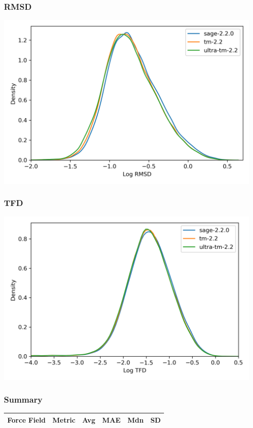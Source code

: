 \documentclass{beamer}
\begin{document}
\begin{frame}
  \frametitle{RMSD}
  \begin{center}
    \includegraphics[height=0.8\textheight]{figs/rmsd}
  \end{center}
\end{frame}

\begin{frame}
  \frametitle{TFD}
  \begin{center}
    \includegraphics[height=0.8\textheight]{figs/tfd}
  \end{center}
\end{frame}

\begin{frame}
  \frametitle{Summary}
  \begin{table}
    \centering
    \begin{tabular}{llrrrr}
      Force Field & Metric & Avg & MAE & Mdn & SD \\
      \hline
      
    \end{tabular}
  \end{table}
\end{frame}
\end{document}
